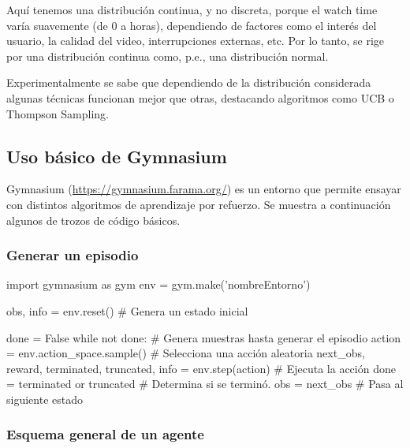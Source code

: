 \documentclass[a4paper, 11pt]{article}
\begin{document}
Aquí tenemos una distribución continua, y no discreta, porque el watch time varía suavemente (de 0 a horas), dependiendo de factores como el interés del usuario, la calidad del video, interrupciones externas, etc. Por lo tanto, se rige por una distribución continua como, p.e., una distribución normal. 

Experimentalmente se sabe que dependiendo de la distribución considerada algunas técnicas funcionan mejor que otras, destacando algoritmos como UCB o Thompson Sampling.




\subsection{Uso básico de Gymnasium} \label{sec:gymnasium}



Gymnasium (\url{https://gymnasium.farama.org/}) es un entorno que permite ensayar con distintos algoritmos de aprendizaje por refuerzo. Se muestra a continuación algunos de trozos de código básicos.


\subsubsection*{Generar un episodio}

\begin{pyverbatim}[][frame=single, fontsize=\scriptsize]
import gymnasium as gym
env = gym.make('nombreEntorno')

obs, info = env.reset() # Genera un estado inicial

done = False
while not done:  # Genera muestras hasta generar el episodio
	action = env.action_space.sample()   # Selecciona una acción aleatoria
	next_obs, reward, terminated, truncated, info = env.step(action) # Ejecuta la acción
	done = terminated or truncated # Determina si se terminó.
	obs = next_obs  # Pasa al siguiente estado
\end{pyverbatim}

\subsubsection*{Esquema general de un agente}
\end{document}
